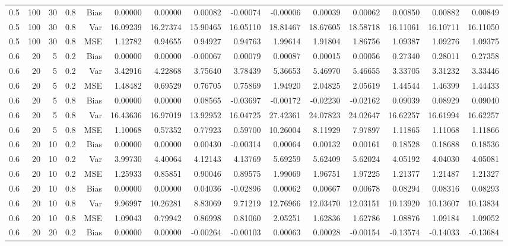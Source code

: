 \begin{table}[!htbp]
\begin{tabular}{lrrrrrrrrrrrrrr}
0.5 & 100 & 30 & 0.8 & Bias & 0.00000 & 0.00000 & 0.00082 & -0.00074 & -0.00006 & 0.00039 & 0.00062 & 0.00850 & 0.00882 & 0.00849 \\
0.5 & 100 & 30 & 0.8 & Var & 16.09239 & 16.27374 & 15.90465 & 16.05110 & 18.81467 & 18.67605 & 18.58718 & 16.11061 & 16.10711 & 16.11050 \\
0.5 & 100 & 30 & 0.8 & MSE & 1.12782 & 0.94655 & 0.94927 & 0.94763 & 1.99614 & 1.91804 & 1.86756 & 1.09387 & 1.09276 & 1.09375 \\
0.6 &  20 &  5 & 0.2 & Bias & 0.00000 & 0.00000 & -0.00067 & 0.00079 & 0.00087 & 0.00015 & 0.00056 & 0.27340 & 0.28011 & 0.27358 \\
0.6 &  20 &  5 & 0.2 & Var & 3.42916 & 4.22868 & 3.75640 & 3.78439 & 5.36653 & 5.46970 & 5.46655 & 3.33705 & 3.31232 & 3.33446 \\
0.6 &  20 &  5 & 0.2 & MSE & 1.48482 & 0.69529 & 0.76705 & 0.75869 & 1.94920 & 2.04825 & 2.05619 & 1.44544 & 1.46399 & 1.44433 \\
0.6 &  20 &  5 & 0.8 & Bias & 0.00000 & 0.00000 & 0.08565 & -0.03697 & -0.00172 & -0.02230 & -0.02162 & 0.09039 & 0.08929 & 0.09040 \\
0.6 &  20 &  5 & 0.8 & Var & 16.43636 & 16.97019 & 13.92952 & 16.04725 & 27.42361 & 24.07823 & 24.02647 & 16.62257 & 16.61994 & 16.62257 \\
0.6 &  20 &  5 & 0.8 & MSE & 1.10068 & 0.57352 & 0.77923 & 0.59700 & 10.26004 & 8.11929 & 7.97897 & 1.11865 & 1.11068 & 1.11866 \\
0.6 &  20 & 10 & 0.2 & Bias & 0.00000 & 0.00000 & 0.00430 & -0.00314 & 0.00064 & 0.00132 & 0.00161 & 0.18528 & 0.18688 & 0.18536 \\
0.6 &  20 & 10 & 0.2 & Var & 3.99730 & 4.40064 & 4.12143 & 4.13769 & 5.69259 & 5.62409 & 5.62024 & 4.05192 & 4.04030 & 4.05081 \\
0.6 &  20 & 10 & 0.2 & MSE & 1.25933 & 0.85851 & 0.90046 & 0.89575 & 1.99069 & 1.96751 & 1.97225 & 1.21377 & 1.21487 & 1.21327 \\
0.6 &  20 & 10 & 0.8 & Bias & 0.00000 & 0.00000 & 0.04036 & -0.02896 & 0.00062 & 0.00667 & 0.00678 & 0.08294 & 0.08316 & 0.08293 \\
0.6 &  20 & 10 & 0.8 & Var & 9.96997 & 10.26281 & 8.83069 & 9.71219 & 12.76966 & 12.03470 & 12.03151 & 10.13920 & 10.13607 & 10.13834 \\
0.6 &  20 & 10 & 0.8 & MSE & 1.09043 & 0.79942 & 0.86998 & 0.81060 & 2.05251 & 1.62836 & 1.62786 & 1.08876 & 1.09184 & 1.09052 \\
0.6 &  20 & 20 & 0.2 & Bias & 0.00000 & 0.00000 & -0.00264 & -0.00103 & 0.00063 & 0.00028 & -0.00154 & -0.13574 & -0.14033 & -0.13684 \\

\end{tabular}
\end{table}
